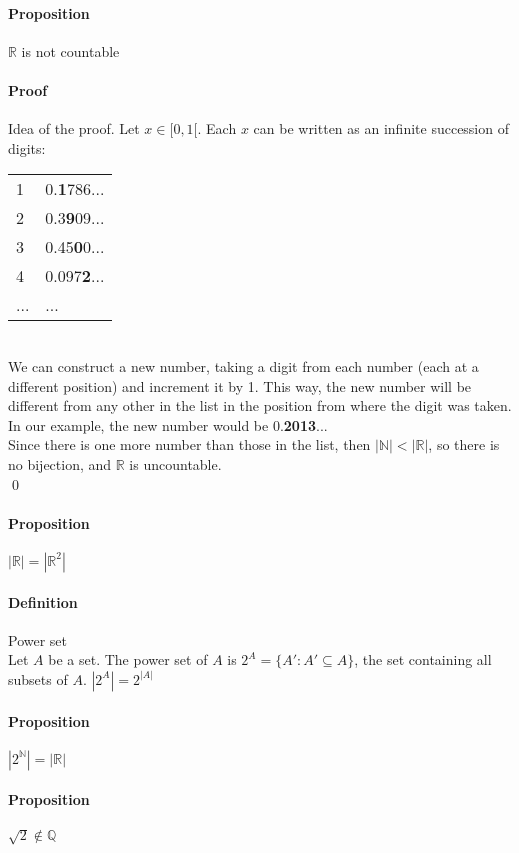 \documentclass{article}
\newcommand{\N}{\mathbb{N}}
\newcommand{\Q}{\mathbb{Q}}
\newcommand{\R}{\mathbb{R}}
\newcommand{\Def}{\paragraph{Definition}}
\newcommand{\Proposition}{\paragraph{Proposition}}
\newcommand{\Proof}{\paragraph{Proof}}
\begin{document}
  \Proposition $\R$ is not countable

  \Proof Idea of the proof. Let $x \in {[}0,1{[}$. Each $x$ can be written as an
  infinite succession of digits:
\\\begin{tabular}{l|l}
    1 & 0.\textbf{1}786... \\
    2 & 0.3\textbf{9}09... \\
    3 & 0.45\textbf{0}0... \\
    4 & 0.097\textbf{2}... \\
    ... & ...
  \end{tabular}
\\We can construct a new number, taking a digit from each number (each at a
  different position) and increment it by 1. This way, the new number will be
  different from any other in the list in the position from where the digit was
  taken. In our example, the new number would be 0.\textbf{2013}...
\\Since there is one more number than those in the list, then $|\N| < |\R|$, so
  there is no bijection, and $\R$ is uncountable.
\\\qed

  \Proposition $|\R| = |\R^2|$

  \Def Power set
\\Let $A$ be a set. The power set of $A$ is $2^A = \{ A' : A' \subseteq A \}$,
  the set containing all subsets of $A$. $|2^A| = 2^{|A|}$

  \Proposition $|2^{\N}| = |\R|$

  \Proposition $\sqrt{2} \notin \Q$
\end{document}
